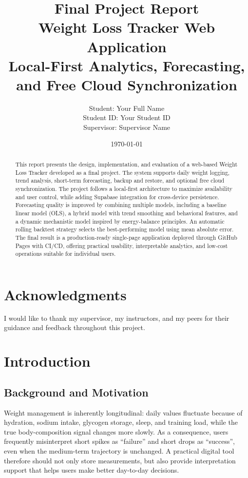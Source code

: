 \documentclass[12pt,a4paper]{report}
\title{\textbf{Final Project Report}\\[0.4em]
\Large Weight Loss Tracker Web Application\\
\normalsize Local-First Analytics, Forecasting, and Free Cloud Synchronization}
\author{Student: Your Full Name \\
Student ID: Your Student ID \\
Supervisor: Supervisor Name}
\date{\today}
\begin{document}
\maketitle

\begin{abstract}
This report presents the design, implementation, and evaluation of a web-based Weight Loss Tracker developed as a final project. The system supports daily weight logging, trend analysis, short-term forecasting, backup and restore, and optional free cloud synchronization. The project follows a local-first architecture to maximize availability and user control, while adding Supabase integration for cross-device persistence. Forecasting quality is improved by combining multiple models, including a baseline linear model (OLS), a hybrid model with trend smoothing and behavioral features, and a dynamic mechanistic model inspired by energy-balance principles. An automatic rolling backtest strategy selects the best-performing model using mean absolute error. The final result is a production-ready single-page application deployed through GitHub Pages with CI/CD, offering practical usability, interpretable analytics, and low-cost operations suitable for individual users.
\end{abstract}

\chapter*{Acknowledgments}
I would like to thank my supervisor, my instructors, and my peers for their guidance and feedback throughout this project.

\tableofcontents
\listoffigures
\listoftables
\clearpage


\chapter{Introduction}
\section{Background and Motivation}
Weight management is inherently longitudinal: daily values fluctuate because of hydration, sodium intake, glycogen storage, sleep, and training load, while the true body-composition signal changes more slowly. As a consequence, users frequently misinterpret short spikes as ``failure'' and short drops as ``success'', even when the medium-term trajectory is unchanged. A practical digital tool therefore should not only store measurements, but also provide interpretation support that helps users make better day-to-day decisions.
\end{document}

